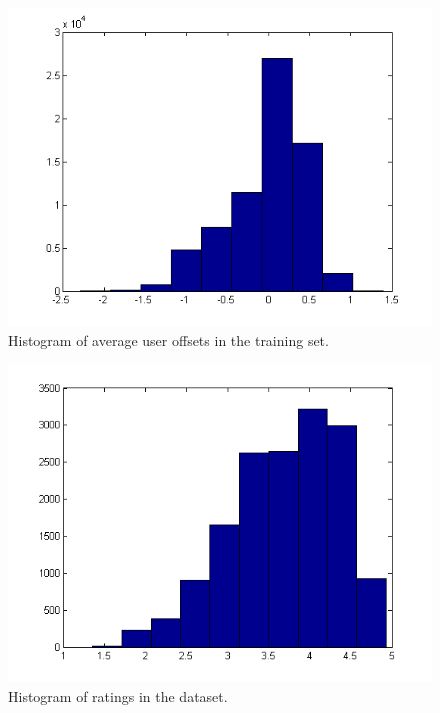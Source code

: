 \documentclass[12pt]{article}
\begin{document}
\begin{figure}
	\center
	\includegraphics[scale=0.5]{user_offsets.png}
	\caption{Histogram of average user offsets in the training set.}
	\label{fig:user_offsets}
\end{figure}

\begin{figure}
	\center
	\includegraphics[scale=0.5]{hist_ratings.png}
	\caption{Histogram of ratings in the dataset.}
	\label{fig:hist_ratings}
\end{figure}

\begin{table}[htbp]
  \centering{}\caption {Best, worst and overall performance of cluster factorization.}\label{clustersFact}
\end{table}%
\end{document}
